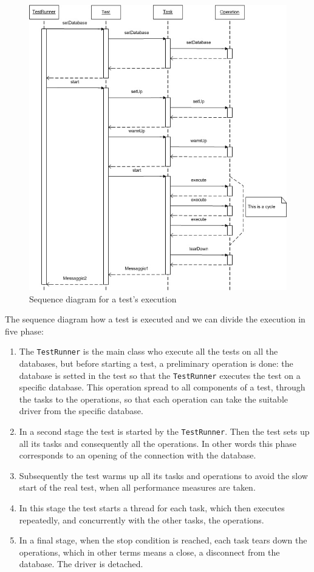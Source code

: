 \begin{figure}[htp!] 
	\begin{center}
		\includegraphics[width=13cm]{img/sequence-diagram.jpg}	
	\end{center}
	\caption{Sequence diagram for a test's execution}
	\label{sequence-diagram}	
\end{figure}

The sequence diagram how a test is executed and we can divide the execution in five phase:
\begin{enumerate}
	\item The \lstinline!TestRunner! is the main class who execute all the tests on all the databases, but before starting a test, a preliminary operation is done: the database is setted in the test so that the \lstinline!TestRunner! executes the test on a specific database. This operation spread to all components of a test, through the tasks to the operations, so that each operation can take the suitable driver from the specific database.
	\item In a second stage the test is started by the \lstinline!TestRunner!. Then the test sets up all its tasks and consequently all the operations. In other words this phase corresponds to an opening of the connection with the database.
	\item Subsequently the test warms up all its tasks and operations to avoid the slow start of the real test, when all performance measures are taken.
	\item In this stage the test starts a thread for each task, which then executes repeatedly, and concurrently with the other tasks, the operations.
	\item In a final stage, when the stop condition is reached, each task tears down the operations, which in other terms means a close, a disconnect from the database. The driver is detached.
\end{enumerate}
			
